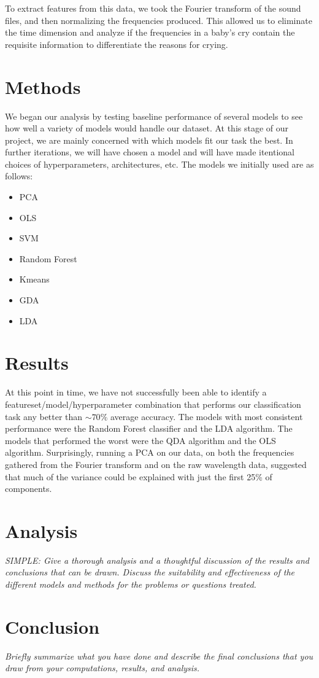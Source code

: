 \documentclass[10pt,letterpaper]{article}
\begin{document}
To extract features from this data, we took the Fourier transform of the sound files, and then normalizing the frequencies produced.
This allowed us to eliminate the time dimension and analyze if the frequencies in a baby's cry contain the requisite information to differentiate the reasons for crying.


\section{Methods}
We began our analysis by testing baseline performance of several models to see how well a variety of models would handle our dataset. At this stage of our project, we are mainly concerned with which models fit our task the best. In further iterations, we will have chosen a model and will have made itentional choices of hyperparameters, architectures, etc. The models we initially used are as follows:
\begin{itemize}
   \item{PCA}
   \item{OLS}
   \item{SVM}
   \item{Random Forest}
   \item{Kmeans}
   \item{GDA}
   \item{LDA}
\end{itemize}

\section{Results}
At this point in time, we have not successfully been able to identify a featureset/model/hyperparameter combination that performs our classification task any better than $\sim70\%$ average accuracy. The models with most consistent performance were the Random Forest classifier and the LDA algorithm. The models that performed the worst were the QDA algorithm and the OLS algorithm.
Surprisingly, running a PCA on our data, on both the frequencies gathered from the Fourier transform and on the raw wavelength data, suggested that much of the variance could be explained with just the first 25\% of components.

\section{Analysis}
\textit{SIMPLE: Give a thorough analysis and a thoughtful discussion of the results and conclusions that can be drawn. Discuss the suitability and effectiveness of the different models and methods for the problems or questions treated.}

\section{Conclusion}
\textit{Briefly summarize what you have done and describe the final conclusions that you draw from your computations, results, and analysis.}
\end{document}
